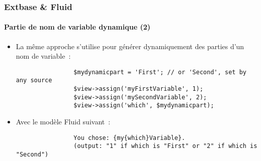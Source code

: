 \begin{frame}[fragile]
	\frametitle{Extbase \& Fluid}
	\framesubtitle{Partie de nom de variable dynamique (2)}

	\lstset{basicstyle=\tiny\ttfamily}

	\begin{itemize}

		\item La même approche s'utilise pour générer dynamiquement des
			parties d'un nom de variable~:

			\begin{lstlisting}
				$mydynamicpart = 'First'; // or 'Second', set by any source
				$view->assign('myFirstVariable', 1);
				$view->assign('mySecondVariable', 2);
				$view->assign('which', $mydynamicpart);
			\end{lstlisting}

		\item Avec le modèle Fluid suivant~:

			\begin{lstlisting}
				You chose: {my{which}Variable}.
				(output: "1" if which is "First" or "2" if which is "Second")
			\end{lstlisting}

	\end{itemize}

\end{frame}


